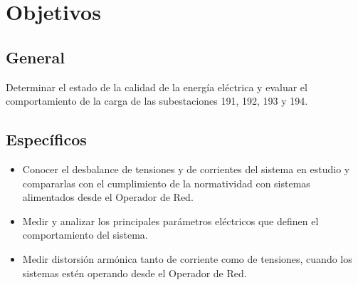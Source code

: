 \chapter{Objetivos} \label{sec:Objetivos}

\section{General}

Determinar el estado de la calidad de la energía eléctrica y evaluar el comportamiento de la carga de las subestaciones 191, 192, 193 y 194.

\section{Específicos}

\begin{itemize}

    \item Conocer el desbalance de tensiones y de corrientes del sistema en estudio y compararlas con el cumplimiento de la normatividad con sistemas alimentados desde el Operador de Red.
    
    \item Medir y analizar los principales parámetros eléctricos que definen el comportamiento del sistema.
    
    \item Medir distorsión armónica tanto de corriente como de tensiones, cuando los sistemas estén operando desde el Operador de Red.
    
\end{itemize}